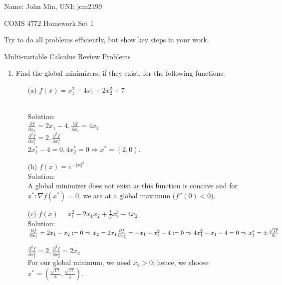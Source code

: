 \documentclass[12pt]{amsart}
\newcommand{\norm}[1]{\Vert #1 \Vert}
\newcommand{\grad}{\nabla}
\begin{document}
{\Large Name: John Min, \Large UNI: jcm2199}  \\
\begin{center}
\Large COMS 4772 \hskip 2in Homework Set 1
\end{center}
\bigskip


Try to do all problems efficiently, but show key steps in your work. 

\noindent
{\sf Multi-variable Calculus Review Problems}

\begin{enumerate}
\item
Find the global minimizers, if they exist, for the following functions.
\begin{enumerate}
\item[(a)] $f(x)=x_1^2-4x_1+2x_2^2+7$

\noindent \\ 
\noindent
Solution: \\
$\frac{\partial f}{\partial x_1} = 2 x_1 - 4, \frac{\partial f}{\partial x_2} = 4 x_2$ \\
$\frac{\partial^2 f}{\partial x_1^2} = 2, \frac{\partial^2 f}{\partial x_1^2}$ \\
$ 2x_1^* - 4 = 0, 4x_2^* = 0 \Rightarrow x^* = (2,0)$. \\


\item[(b)] $f(x)=e^{-\norm{x}^2}$ \\

Solution:\\
A global minimizer does not exist as this function is concave and for $x^*: \grad f(x^*) = 0$, we are at a global maximum ($f''(0) < 0$).\\

\item[(c)] $f(x)=x_1^2-2x_1x_2+\frac{1}{3}x_2^3-4x_2$ \\

\noindent
Solution:\\
$\frac{\partial f}{\partial x_1} = 2x_1 - x_2 := 0 \Rightarrow x_2 = 2x_1 \\
\frac{\partial f}{\partial x_2} = -x_1 + x_2^2 - 4 := 0 \Rightarrow 4x_1^2 - x_1 - 4 = 0 \Rightarrow x_1^* = \pm \frac{\sqrt{17}}{8}$

$\frac{\partial^2 f}{\partial x_1^2} = 2, \frac{\partial^2 f}{\partial x_2^2} = 2x_2$ \\
\noindent
For our global minimum, we need $x_2 > 0$; hence, we choose $x^* = (\frac{\sqrt{17}}{8}, \frac{\sqrt{17}}{4})$.\\


\end{enumerate}
\end{enumerate}
\end{document}
